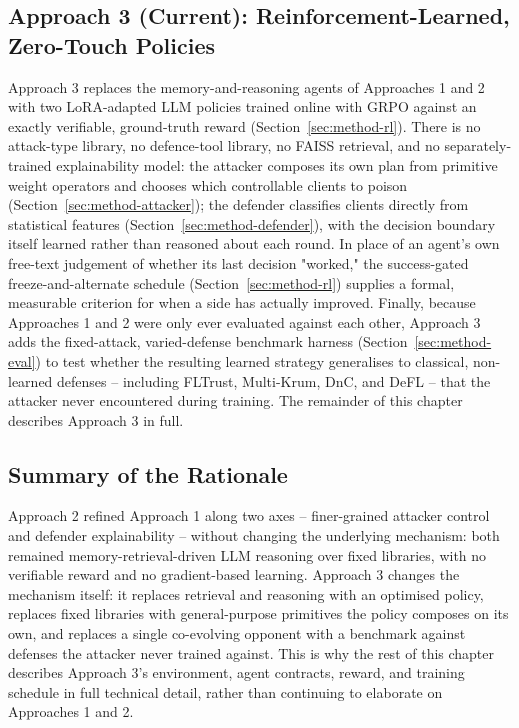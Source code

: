 \subsection{Approach 3 (Current): Reinforcement-Learned, Zero-Touch Policies}
\label{sec:method-approach3}
Approach 3 replaces the memory-and-reasoning agents of Approaches 1 and 2 with two LoRA-adapted LLM policies trained online with GRPO against an exactly verifiable, ground-truth reward (Section~\ref{sec:method-rl}). There is no attack-type library, no defence-tool library, no FAISS retrieval, and no separately-trained explainability model: the attacker composes its own plan from primitive weight operators and chooses which controllable clients to poison (Section~\ref{sec:method-attacker}); the defender classifies clients directly from statistical features (Section~\ref{sec:method-defender}), with the decision boundary itself learned rather than reasoned about each round. In place of an agent's own free-text judgement of whether its last decision "worked," the success-gated freeze-and-alternate schedule (Section~\ref{sec:method-rl}) supplies a formal, measurable criterion for when a side has actually improved. Finally, because Approaches 1 and 2 were only ever evaluated against each other, Approach 3 adds the fixed-attack, varied-defense benchmark harness (Section~\ref{sec:method-eval}) to test whether the resulting learned strategy generalises to classical, non-learned defenses -- including FLTrust, Multi-Krum, DnC, and DeFL -- that the attacker never encountered during training. The remainder of this chapter describes Approach 3 in full.

\subsection{Summary of the Rationale}
\label{sec:method-evolution-why}
Approach 2 refined Approach 1 along two axes -- finer-grained attacker control and defender explainability -- without changing the underlying mechanism: both remained memory-retrieval-driven LLM reasoning over fixed libraries, with no verifiable reward and no gradient-based learning. Approach 3 changes the mechanism itself: it replaces retrieval and reasoning with an optimised policy, replaces fixed libraries with general-purpose primitives the policy composes on its own, and replaces a single co-evolving opponent with a benchmark against defenses the attacker never trained against. This is why the rest of this chapter describes Approach 3's environment, agent contracts, reward, and training schedule in full technical detail, rather than continuing to elaborate on Approaches 1 and 2.

